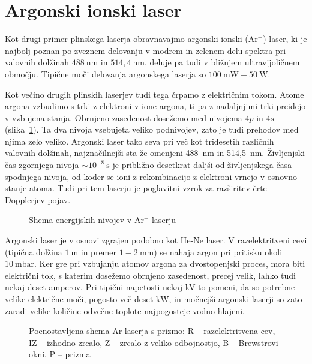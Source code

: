 \section{Argonski ionski laser}
Kot drugi primer plinskega laserja obravnavajmo argonski ionski (Ar$^+$) laser,
ki je najbolj poznan po zveznem delovanju v modrem in zelenem delu spektra pri 
valovnih dolžinah $488~\si{\nano\metre}$ in $514,4~\si{\nano\metre}$, deluje 
pa tudi v bližnjem ultravijoličnem območju. Tipične moči delovanja argonskega laserja
so $100~\si{\milli\watt} - 50~\si{\watt}$.

Kot večino drugih plinskih laserjev tudi tega črpamo z električnim tokom.
Atome argona vzbudimo s trki z elektroni v ione argona, ti pa z nadaljnjimi
trki preidejo v vzbujena stanja. Obrnjeno zasedenost
dosežemo med nivojema $4p$ in $4s$ (slika~\ref{fig:ArE}). 
Ta dva nivoja vsebujeta veliko podnivojev, zato je tudi prehodov med
njima zelo veliko. Argonski laser tako seva pri več kot tridesetih različnih
valovnih dolžinah, najznačilnejši sta že omenjeni 488~nm in 514,5~nm. 
Življenjski čas zgornjega nivoja $\sim 10^{-8}~\si{\second}$ je približno 
desetkrat daljši od življenjskega časa spodnjega nivoja, od koder se ioni
z rekombinacijo z elektroni vrnejo v osnovno stanje atoma. Tudi pri tem laserju
je poglavitni vzrok za razširitev črte Dopplerjev 
pojav.

\begin{figure}[h]
\centering
\def\svgwidth{80truemm} 

\caption{Shema energijskih nivojev v Ar$^+$ laserju}
\label{fig:ArE}
\end{figure}

Argonski laser je v osnovi zgrajen podobno kot He-Ne laser. 
V razelektritveni cevi
(tipična dolžina $1~\si{\metre}$ in premer $1-2~\si{\milli\metre}$)
se nahaja argon pri pritisku okoli $10~\si{\milli\bar}$. Ker gre pri 
vzbujanju atomov argona za dvostopenjski proces, mora biti električni tok, 
s katerim dosežemo obrnjeno zasedenost, precej velik, lahko tudi nekaj deset amperov. 
Pri tipični napetosti nekaj kV to pomeni, da so potrebne velike električne moči, 
pogosto več deset $\si{\kilo\watt}$, in močnejši argonski laserji so zato zaradi 
velike količine odvečne toplote najpogosteje vodno hlajeni.

\begin{figure}[h]
\centering
\def\svgwidth{110truemm} 

\caption{Poenostavljena shema Ar laserja s prizmo: R -- razelektritvena cev, 
IZ -- izhodno zrcalo, Z -- zrcalo z veliko odbojnostjo, B -- Brewstrovi okni, 
P -- prizma
}
\label{fig:ArS}
\end{figure}

